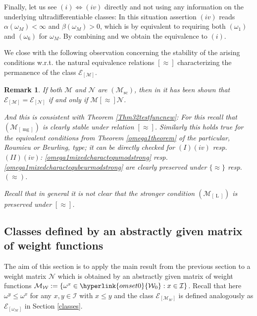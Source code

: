 \documentclass[10pt]{amsart}%
\numberwithin{equation}{section}
\theoremstyle{plain}
\newtheorem{remark}[proposition]{Remark}
\let\on=\operatorname
\begin{document}
\begin{itemize}
Finally, let us see $(i)\Leftrightarrow(iv)$ directly and not using any information on the underlying ultradifferentiable classes: In this situation assertion $(iv)$ reads $\alpha(\omega_M)<\infty$ and $\beta(\omega_M)>0$, which is by \cite[Cor. 2.14, Cor. 2.17]{index} equivalent to requiring both \hyperlink{om1}{$(\omega_1)$} and \hyperlink{om6}{$(\omega_6)$} for $\omega_M$. By combining \cite[Prop. 3.6]{Komatsu73} and \cite[Thm. 3.1]{subaddlike} we obtain the equivalence to $(i)$.
\end{itemize}

We close with the following observation concerning the stability of the arising conditions w.r.t. the natural equivalence relations $[\approx]$ characterizing the permanence of the class $\mathcal{E}_{[\mathcal{M}]}$.

\begin{remark}\label{equivremark}
If both $\mathcal{M}$ and $\mathcal{N}$ are \hyperlink{Msc}{$(\mathcal{M}_{\on{sc}})$}, then in \cite[Prop. 4.6]{compositionpaper} it has been shown that $\mathcal{E}_{[\mathcal{M}]}=\mathcal{E}_{[\mathcal{N}]}$ if and only if $\mathcal{M}[\approx]\mathcal{N}$.\vspace{6pt}

And this is consistent with Theorem \ref{Thm32testfuncnew}: For this recall that $(\mathcal{M}_{[\on{mg}]})$ is clearly stable under relation $[\approx]$. Similarly this holds true for the equivalent conditions from Theorem \ref{omega1theorem} of the particular, Roumieu or Beurling, type; it can be directly checked for $(I)(iv)$ resp. $(II)(iv)$: \eqref{omega1mixedcharactequmodstrong} resp. \eqref{omega1mixedcharactequbeurmodstrong} are clearly preserved under $\{\approx\}$ resp. $(\approx)$.

Recall that in general it is not clear that the stronger condition $(\mathcal{M}_{[\on{L}]})$ is preserved under $[\approx]$.
\end{remark}

\subsection{Classes defined by an abstractly given matrix of weight functions}\label{consequencesforultrafct}
The aim of this section is to apply the main result from the previous section to a weight matrix $\mathcal{N}$ which is obtained by an abstractly given matrix of weight functions $\mathcal{M}_{\mathcal{W}}:=\{\omega^x\in\hyperlink{omset0}{\mathcal{W}_0}: x\in\mathcal{I}\}$. Recall that here $\omega^y\le\omega^x$ for any $x,y\in\mathcal{I}$ with $x\le y$ and the class $\mathcal{E}_{[\mathcal{M}_{\mathcal{W}}]}$ is defined analogously as $\mathcal{E}_{[\omega_{\mathcal{M}}]}$ in Section \ref{classes}.
\end{document}
